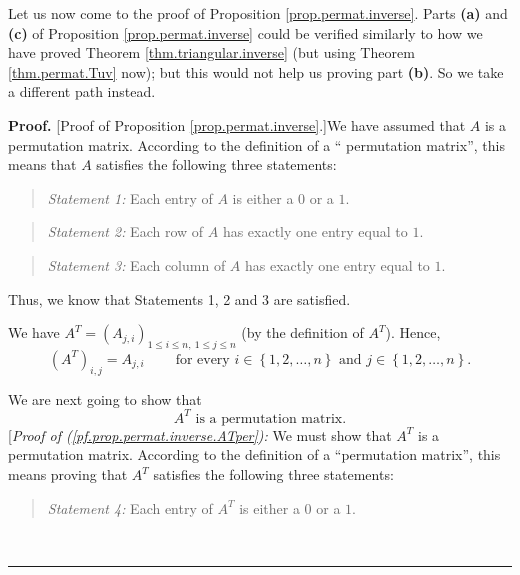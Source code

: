 \documentclass[numbers=enddot,12pt,final,onecolumn,notitlepage]{scrartcl}%
\theoremstyle{definition}
\newenvironment{statement}{\begin{quote}}{\end{quote}}
\newenvironment{proof}[1][Proof]{\noindent\textbf{#1.} }{\ \rule{0.5em}{0.5em}}
\begin{document}
Let us now come to the proof of Proposition \ref{prop.permat.inverse}. Parts
\textbf{(a)} and \textbf{(c)} of Proposition \ref{prop.permat.inverse} could
be verified similarly to how we have proved Theorem
\ref{thm.triangular.inverse} (but using Theorem \ref{thm.permat.Tuv} now); but
this would not help us proving part \textbf{(b)}. So we take a different path instead.

\begin{proof}
[Proof of Proposition \ref{prop.permat.inverse}.]We have assumed that $A$ is a
permutation matrix. According to the definition of a \textquotedblleft
permutation matrix\textquotedblright, this means that $A$ satisfies the
following three statements:

\begin{statement}
\textit{Statement 1:} Each entry of $A$ is either a $0$ or a $1$.
\end{statement}

\begin{statement}
\textit{Statement 2:} Each row of $A$ has exactly one entry equal to $1$.
\end{statement}

\begin{statement}
\textit{Statement 3:} Each column of $A$ has exactly one entry equal to $1$.
\end{statement}

Thus, we know that Statements 1, 2 and 3 are satisfied.

We have $A^{T}=\left(  A_{j,i}\right)  _{1\leq i\leq n,\ 1\leq j\leq n}$ (by
the definition of $A^{T}$). Hence,%
\begin{equation}
\left(  A^{T}\right)  _{i,j}=A_{j,i}\ \ \ \ \ \ \ \ \ \ \text{for every }%
i\in\left\{  1,2,\ldots,n\right\}  \text{ and }j\in\left\{  1,2,\ldots
,n\right\}  . \label{pf.prop.permat.inverse.c.1}%
\end{equation}


We are next going to show that%
\begin{equation}
A^{T}\text{ is a permutation matrix.} \label{pf.prop.permat.inverse.ATper}%
\end{equation}
[\textit{Proof of (\ref{pf.prop.permat.inverse.ATper}):} We must show that
$A^{T}$ is a permutation matrix. According to the definition of a
\textquotedblleft permutation matrix\textquotedblright, this means proving
that $A^{T}$ satisfies the following three statements:

\begin{statement}
\textit{Statement 4:} Each entry of $A^{T}$ is either a $0$ or a $1$.
\end{statement}


\end{proof}
\end{document}
